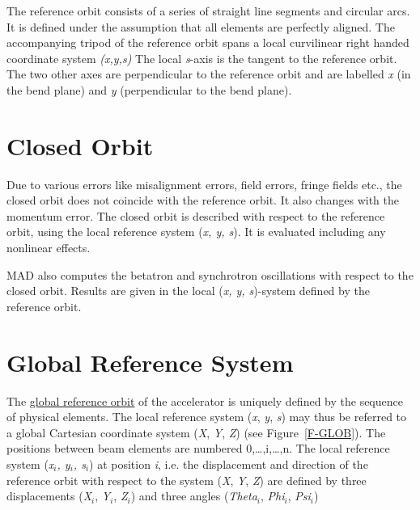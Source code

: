 The reference orbit consists of a series of straight line segments and
circular arcs. It is defined under the assumption that all elements are
perfectly aligned. The accompanying tripod of the reference orbit spans
a local curvilinear right handed coordinate system \textit{(x,y,s)} The
local \textit{s}-axis is the tangent to the reference orbit. The two
other axes are perpendicular to the reference orbit and are labelled
\textit{x} (in the bend plane) and \textit{y} (perpendicular to the bend
plane).  


\section{Closed Orbit}
\label{sec:closed_orbit}

Due to various errors like misalignment errors, field errors, fringe
fields etc., the closed orbit does not coincide with the reference
orbit. It also changes with the momentum error. The closed orbit is
described with respect to the reference orbit, using the local
reference system (\textit{x, y, s}). It is evaluated including any
nonlinear effects.  

MAD also computes the betatron and synchrotron oscillations with respect
to the closed orbit. Results are given in the local (\textit{x, y,
  s})-system defined by the reference orbit. 



\section{Global Reference System}
\label{sec:global_ref}

The \hyperlink{global}{global reference orbit} of the accelerator is
uniquely defined by the sequence of physical elements. The local
reference system (\textit{x}, \textit{y}, \textit{s}) may thus be
referred to a global Cartesian coordinate system (\textit{X},
\textit{Y}, \textit{Z}) (see Figure~\ref{F-GLOB}). 
The positions between beam elements are numbered 0,\ldots,i,\ldots,n. 
The local reference system  (\textit{x$_i$, y$_i$, s$_i$}) at position
\textit{i}, i.e. the displacement and direction of the reference orbit
with respect to the system (\textit{X}, \textit{Y}, \textit{Z}) are
defined by three displacements  (\textit{X$_i$}, \textit{Y$_i$},
\textit{Z$_i$}) and three angles (\textit{Theta$_i$}, \textit{Phi$_i$},
\textit{Psi$_i$}) 

